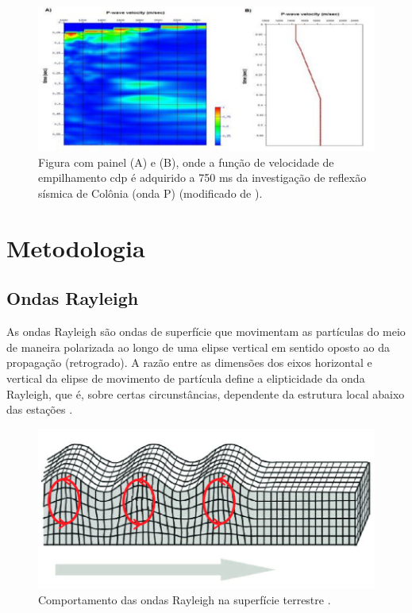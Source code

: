\documentclass[smallextended]{svjour3}       %
\begin{document}
\begin{figure}[!hbtp]
  \begin{center}
  
  \includegraphics[scale=0.5]{Figures/fig2.png}
  \end{center}
  \caption{Figura com painel (A) e (B), onde a função de velocidade de empilhamento cdp é adquirido a 750 ms da investigação de reflexão sísmica de Colônia (onda P) (modificado de \citealp{riccomini2011colonia}).
  }
  \label{fun_vel}
\end{figure}


\section{Metodologia}
\label{methods}

\subsection{Ondas Rayleigh}

As ondas Rayleigh são ondas de superfície que movimentam as partículas do meio de maneira polarizada ao longo de uma elipse vertical em sentido oposto ao da propagação (retrogrado). A razão entre as dimensões dos eixos horizontal e vertical da elipse de movimento de partícula define a elipticidade da onda Rayleigh, que é, sobre certas circunstâncias, dependente da estrutura local abaixo das estações \citep{berbellini2019constraining}.

\begin{figure}[!hbtp]
\begin{center}

\includegraphics[scale=0.5]{Figures/ondas_rayleigh.png}
\end{center}
\caption{Comportamento das ondas Rayleigh na superfície terrestre \citep{de2009filtragem}.}
\label{ondas_rayleigh}
\end{figure}
\end{document}
